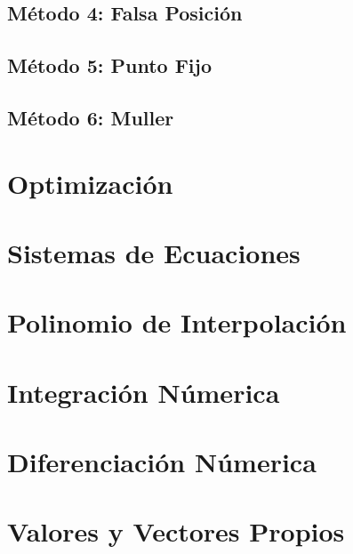 \documentclass[10pt,a4paper]{article}
\begin{document}
		\subsection{Método 4: Falsa Posición}
		
		
	
		\subsection{Método 5: Punto Fijo}
		
		
	
		\subsection{Método 6: Muller}
	
		
		
	\section{Optimización}
	
	\section{Sistemas de Ecuaciones}
	
	\section{Polinomio de Interpolación}
	
	\section{Integración Númerica}
	
	\section{Diferenciación Númerica}
	
	\section{Valores y Vectores Propios}
	
\end{document}

